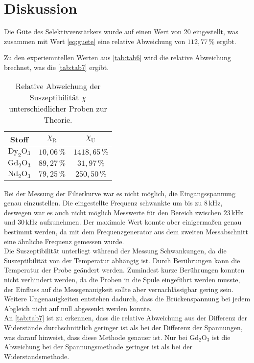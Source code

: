 \section{Diskussion}
\label{sec:Diskussion}

Die Güte des Selektivverstärkers wurde auf einen Wert von 20 eingestellt, was zusammen mit Wert \eqref{eq:guete} eine relative Abweichung von $112,77 \, \%$ ergibt.
 
Zu den experiemntellen Werten aus \autoref{tab:tab6} wird die relative Abweichung brechnet, was die \autoref{tab:tab7} ergibt.

\begin{table}[H]
    \centering
    \caption{Relative Abweichung der Suszeptibilität $\chi$ unterschiedlicher Proben zur Theorie.}
    \label{tab:tab7}
    \begin{tabular}{S S S}
      \toprule
       {Stoff} & {$\chi_{\text{R}}$} & {$\chi_{\text{U}}$}  \\
      \midrule
      {$\text{Dy}_2\text{O}_3$}  &{$10,06 \, \%$}    &{$ 1418,65 \, \%$}\\
      {$\text{Gd}_2\text{O}_3$}  &{$89,27 \, \%$}    &{$ 31,97 \, \%$}\\
      {$\text{Nd}_2\text{O}_3$}  &{$79,25 \, \%$}    &{$ 250,50 \, \%$}\\
      \bottomrule
    \end{tabular}
\end{table}

Bei der Messung der Filterkurve war es nicht möglich, die Eingangsspannung genau einzustellen. 
Die eingestellte Frequenz schwankte um bis zu $ 8 \, \unit{\kilo\hertz}$, deswegen war es auch nicht möglich Messwerte für den Bereich zwischen $ 23 \, \unit{\kilo\hertz} $ und $ 30 \, \unit{\kilo\hertz} $  aufzunehmen.
Der maximale Wert konnte aber einigermaßen genau bestimmt werden, da mit dem Frequenzgenerator aus dem zweiten Messabschnitt eine ähnliche Frequenz gemessen wurde. \\

Die Suszeptibilität unterliegt während der Messung Schwankungen, da die Suszeptibilität von der Temperatur abhängig ist. 
Durch Berührungen kann die Temperatur der Probe geändert werden. 
Zumindest kurze Berührungen konnten nicht verhindert werden, da die Proben in die Spule eingeführt werden musste, der Einfluss auf die Messgenauigkeit sollte aber vernachlässigbar gering sein. \\
Weitere Ungenauigkeiten entstehen  dadurch, dass die Brückenspannung bei jedem Abgleich nicht auf null abgesenkt werden konnte. \\

An \autoref{tab:tab7} ist zu erkennen, dass die relative Abweichung aus der Differenz der Widerstände durchschnittlich geringer ist als bei der Differenz der Spannungen, was darauf hinweist, dass diese Methode genauer ist.
Nur bei $\text{Gd}_2\text{O}_3$ ist die Abweichung bei der Spannungsmethode geringer ist als bei der Widerstandsmethode.
